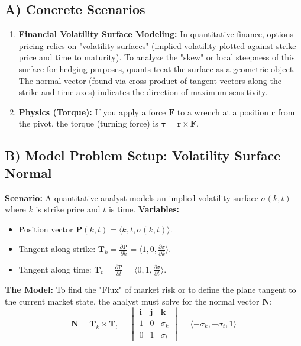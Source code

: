 \documentclass[11pt]{article}
\renewcommand{\vec}[1]{\mathbf{#1}}
\newcommand{\ihat}{\mathbf{i}}
\newcommand{\jhat}{\mathbf{j}}
\newcommand{\khat}{\mathbf{k}}
\begin{document}
\subsection{A) Concrete Scenarios}
\begin{enumerate}
    \item \textbf{Financial Volatility Surface Modeling:} In quantitative finance, options pricing relies on "volatility surfaces" (implied volatility plotted against strike price and time to maturity). To analyze the "skew" or local steepness of this surface for hedging purposes, quants treat the surface as a geometric object. The normal vector (found via cross product of tangent vectors along the strike and time axes) indicates the direction of maximum sensitivity.
    \item \textbf{Physics (Torque):} If you apply a force $\vec{F}$ to a wrench at a position $\vec{r}$ from the pivot, the torque (turning force) is $\vec{\tau} = \vec{r} \times \vec{F}$.
\end{enumerate}

\subsection{B) Model Problem Setup: Volatility Surface Normal}
\textbf{Scenario:} A quantitative analyst models an implied volatility surface $\sigma(k, t)$ where $k$ is strike price and $t$ is time.
\textbf{Variables:}
\begin{itemize}
    \item Position vector $\vec{P}(k, t) = \langle k, t, \sigma(k, t) \rangle$.
    \item Tangent along strike: $\vec{T}_k = \frac{\partial \vec{P}}{\partial k} = \langle 1, 0, \frac{\partial \sigma}{\partial k} \rangle$.
    \item Tangent along time: $\vec{T}_t = \frac{\partial \vec{P}}{\partial t} = \langle 0, 1, \frac{\partial \sigma}{\partial t} \rangle$.
\end{itemize}
\textbf{The Model:} To find the "Flux" of market risk or to define the plane tangent to the current market state, the analyst must solve for the normal vector $\vec{N}$:
\[
\vec{N} = \vec{T}_k \times \vec{T}_t = \begin{vmatrix} \ihat & \jhat & \khat \\ 1 & 0 & \sigma_k \\ 0 & 1 & \sigma_t \end{vmatrix} = \langle -\sigma_k, -\sigma_t, 1 \rangle
\]
\end{document}
